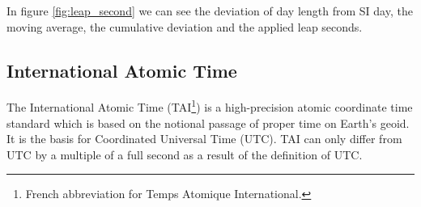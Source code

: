 In figure \ref{fig:leap_second} we can see the deviation of day length from SI day, the moving average, the cumulative deviation and the applied leap seconds.

\subsection{International Atomic Time}

The International Atomic Time (TAI\footnote{French abbreviation for Temps Atomique International.}) is a high-precision atomic coordinate time standard which is based on the notional passage of proper time on Earth's geoid.\cite{tai} It is the basis for Coordinated Universal Time (UTC). TAI can only differ from UTC by a multiple of a full second as a result of the definition of UTC.

